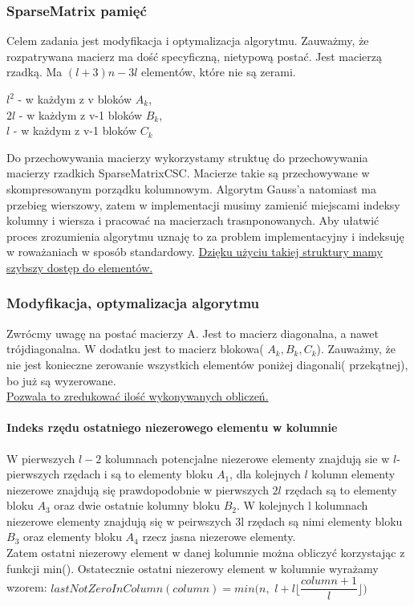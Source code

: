 \documentclass[11pt]{article}
\begin{document}
\begin{flushleft}
\subsubsection{SparseMatrix pamięć}
Celem zadania jest modyfikacja i optymalizacja algorytmu. Zauważmy, że rozpatrywana macierz ma dość specyficzną, nietypową postać. Jest macierzą rzadką. Ma $(l+3)n-3l$ elementów, które nie są zerami.\\
\begin{center}
$l^2$ - w każdym z v bloków $A_k$, \\ $2l$ - w każdym z v-1 bloków $B_k$, \\ $l$ - w każdym z v-1 bloków $C_k$\end{center} Do przechowywania macierzy wykorzystamy struktuę do przechowywania macierzy rzadkich SparseMatrixCSC. Macierze takie są przechowywane w skompresowanym porządku kolumnowym. Algorytm Gauss'a natomiast ma przebieg wierszowy, zatem w implementacji musimy zamienić miejscami indeksy kolumny i wiersza i pracować na macierzach trasnponowanych. Aby ułatwić proces zrozumienia algorytmu uznaję to za problem implementacyjny i indeksuję w roważaniach w sposób standardowy. \underline{Dzięku użyciu takiej struktury mamy szybszy dostęp do elementów.}
\subsubsection{Modyfikacja, optymalizacja algorytmu}
Zwrócmy uwagę na postać macierzy A. Jest to macierz diagonalna, a nawet trójdiagonalna. W dodatku jest to macierz blokowa( $A_k,B_k,C_k$). Zauważmy, że nie jest konieczne zerowanie wszystkich elementów poniżej diagonali( przekątnej), bo już są wyzerowane. \\ \underline{Pozwala to zredukować ilość wykonywanych obliczeń.}\\ 
\paragraph{Indeks rzędu ostatniego niezerowego elementu w kolumnie} W pierwszych $l-2$ kolumnach potencjalne niezerowe elementy znajdują sie w $l$-pierwszych rzędach i są to elementy bloku $A_1$, dla kolejnych $l$ kolumn elementy niezerowe znajdują się prawdopodobnie w pierwszych $2l$ rzędach są to elementy bloku $A_3$ oraz dwie ostatnie kolumny bloku $B_2$. W kolejnych l kolumnach niezerowe elementy znajdują się w peirwszych 3l rzędach są nimi elementy bloku $B_3$ oraz elementy bloku $A_4$ rzecz jasna niezerowe elementy.\\
Zatem ostatni niezerowy element w danej kolumnie można obliczyć korzystając z funkcji min(). Ostatecznie ostatni niezerowy element w kolumnie wyrażamy wzorem: $ lastNotZeroInColumn(column) = min \Big( n,$ $l+l \Big \lfloor \dfrac{column+1}{l} \Big \rfloor \Big)$

\end{flushleft}
\end{document}
